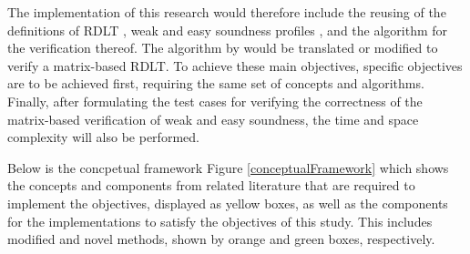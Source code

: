 The implementation of this research would therefore include the reusing of the definitions of RDLT \cite{Malinao2017}, weak and easy soundness profiles \cite{Ramirez2024}, and the algorithm for the verification thereof. The algorithm by \cite{Ramirez2024} would be translated or modified to verify a matrix-based RDLT. To achieve these main objectives, specific objectives are to be achieved first, requiring the same set of concepts and algorithms. Finally, after formulating the test cases for verifying the correctness of the matrix-based verification of weak and easy soundness, the time and space complexity will also be performed. 

Below is the concpetual framework Figure \ref{conceptualFramework} which shows the concepts and components from related literature that are required to implement the objectives, displayed as yellow boxes, as well as the components for the implementations to satisfy the objectives of this study. This includes modified and novel methods, shown by orange and green boxes, respectively.


 
\newpage


